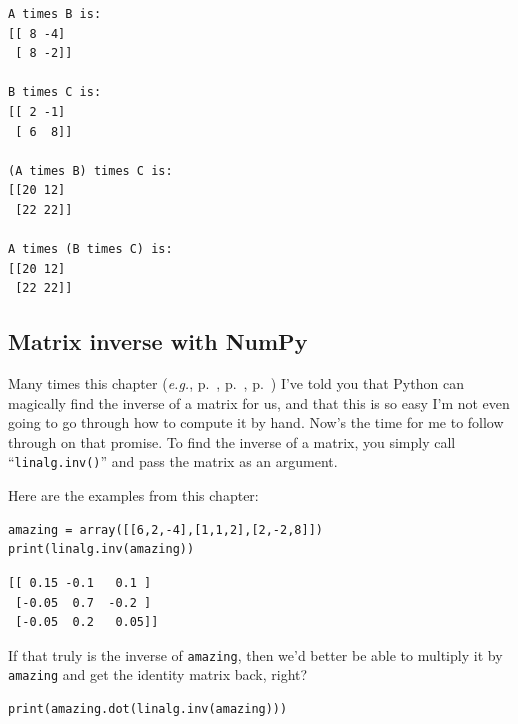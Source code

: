 \vspace{-.2in}

\begin{Verbatim}[fontsize=\small,samepage=true,frame=leftline,framesep=5mm,framerule=1mm]
A times B is:
[[ 8 -4]
 [ 8 -2]]

B times C is:
[[ 2 -1]
 [ 6  8]]

(A times B) times C is:
[[20 12]
 [22 22]]

A times (B times C) is:
[[20 12]
 [22 22]]
\end{Verbatim}

\subsection*{Matrix inverse with NumPy}


Many times this chapter (\textit{e.g.}, p.~\pageref{askPython1},
p.~\pageref{askPython2}, p.~\pageref{askPython3}) I've told you that Python can
magically find the inverse of a matrix for us, and that this is so easy I'm not
even going to go through how to compute it by hand. Now's the time for me to
follow through on that promise. To find the inverse of a matrix, you simply
call ``\texttt{linalg.inv()}'' and pass the matrix as an argument.

Here are the examples from this chapter:

\begin{Verbatim}[fontsize=\small,samepage=true,frame=single,framesep=3mm]
amazing = array([[6,2,-4],[1,1,2],[2,-2,8]])
print(linalg.inv(amazing))
\end{Verbatim}
\vspace{-.4in}

\begin{Verbatim}[fontsize=\small,samepage=true,frame=leftline,framesep=5mm,framerule=1mm]
[[ 0.15 -0.1   0.1 ]
 [-0.05  0.7  -0.2 ]
 [-0.05  0.2   0.05]]
\end{Verbatim}

If that truly is the inverse of \texttt{amazing}, then we'd better be able to
multiply it by \texttt{amazing} and get the identity matrix back, right?

\begin{Verbatim}[fontsize=\small,samepage=true,frame=single,framesep=3mm]
print(amazing.dot(linalg.inv(amazing)))
\end{Verbatim}
\vspace{-.4in}

